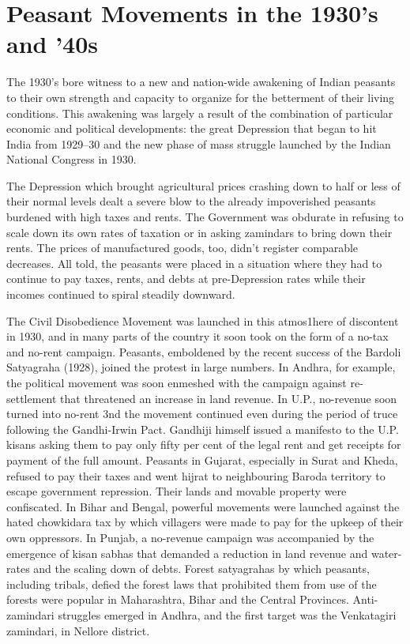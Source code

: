 \chapter{Peasant Movements in the 1930's and '40s}
\begin{multicols}{2}

The 1930's bore witness to a new and nation-wide awakening of Indian peasants to their own strength and capacity to organize for the betterment of their living conditions. This awakening was largely a result of the combination of particular economic and political developments: the great Depression that began to hit India from 1929--30 and the new phase of mass struggle launched by the Indian National Congress in 1930.

The Depression which brought agricultural prices crashing down to half or less of their normal levels dealt a severe blow to the already impoverished peasants burdened with high taxes and rents. The Government was obdurate in refusing to scale down its own rates of taxation or in asking zamindars to bring down their rents. The prices of manufactured goods, too, didn't register comparable decreases. All told, the peasants were placed in a situation where they had to continue to pay taxes, rents, and debts at pre-Depression rates while their incomes continued to spiral steadily downward.

The Civil Disobedience Movement was launched in this atmos1here of discontent in 1930, and in many parts of the country it soon took on the form of a no-tax and no-rent campaign. Peasants, emboldened by the recent success of the Bardoli Satyagraha (1928), joined the protest in large numbers. In Andhra, for example, the political movement was soon enmeshed with the campaign against re-settlement that threatened an increase in land revenue. In U.P., no-revenue soon turned into no-rent 3nd the movement continued even during the period of truce following the Gandhi-Irwin Pact. Gandhiji himself issued a manifesto to the U.P. kisans asking them to pay only fifty per cent of the legal rent and get receipts for payment of the full amount. Peasants in Gujarat, especially in Surat and Kheda, refused to pay their taxes and went hijrat to neighbouring Baroda territory to escape government repression. Their lands and movable property were confiscated. In Bihar and Bengal, powerful movements were launched against the hated chowkidara tax by which villagers were made to pay for the upkeep of their own oppressors. In Punjab, a no-revenue campaign was accompanied by the emergence of kisan sabhas that demanded a reduction in land revenue and water-rates and the scaling down of debts. Forest satyagrahas by which peasants, including tribals, defied the forest laws that prohibited them from use of the forests were popular in Maharashtra, Bihar and the Central Provinces. Anti-zamindari struggles emerged in Andhra, and the first target was the Venkatagiri zamindari, in Nellore district.


\end{multicols}
